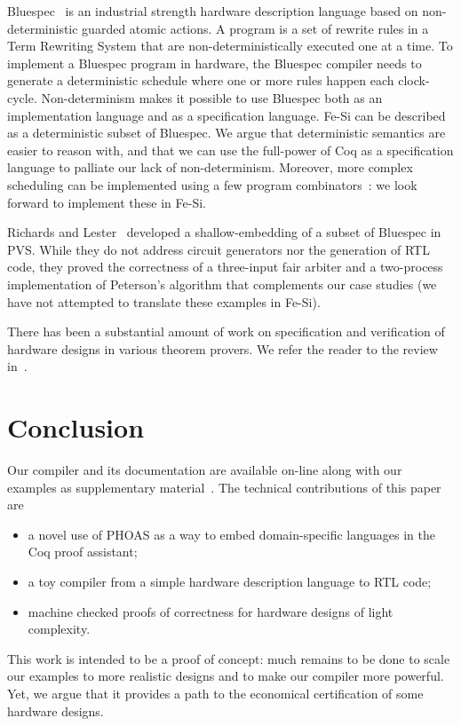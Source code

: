 \documentclass{llncs}
\begin{document}
\medskip

Bluespec~\cite{bluespec} is an industrial strength hardware
description language based on non-deterministic guarded atomic
actions. A program is a set of rewrite rules in a Term Rewriting
System that are non-deterministically executed one at a time. 
%
To implement a Bluespec program in hardware, the Bluespec compiler
needs to generate a deterministic schedule where one or more rules
happen each clock-cycle.
%
Non-determinism makes it possible to use Bluespec both as an
implementation language and as a specification language.
%
%
%
Fe-Si can be described as a deterministic subset of Bluespec. 
%
We argue that deterministic semantics are easier to reason with, and
that we can use the full-power of Coq as a specification language to
palliate our lack of non-determinism.
%
Moreover, more complex scheduling can be implemented using a few
program combinators~\cite{DBLP:conf/memocode/DaveAP07}: we look
forward to implement these in Fe-Si. 

Richards and Lester~\cite{DBLP:journals/isse/RichardsL11} developed a
shallow-embedding of a subset of Bluespec in PVS. While they do not
address circuit generators nor the generation of RTL code, they proved
the correctness of a three-input fair arbiter and a two-process
implementation of Peterson's algorithm that complements our case
studies (we have not attempted to translate these examples in Fe-Si).

\medskip 

There has been a substantial amount of work on specification and
verification of hardware designs in various theorem provers. We refer
the reader to the review in~\cite{DBLP:conf/cpp/Braibant11}.


\section{Conclusion}
Our compiler and its documentation are available on-line along with
our examples as supplementary material~\cite{fesi}. 
%
The technical contributions of this paper are
\begin{itemize}
\item a novel use of PHOAS as a way to embed domain-specific languages
  in the Coq proof assistant; 
\item a toy compiler from a simple hardware description language to
  RTL code;
\item machine checked proofs of correctness for hardware designs of
  light complexity. 
\end{itemize}

This work is intended to be a proof of concept: much remains to be
done to scale our examples to more realistic designs and to make our
compiler more powerful. Yet, we argue that it provides a path to
the economical certification of some hardware designs. 


\end{document}
